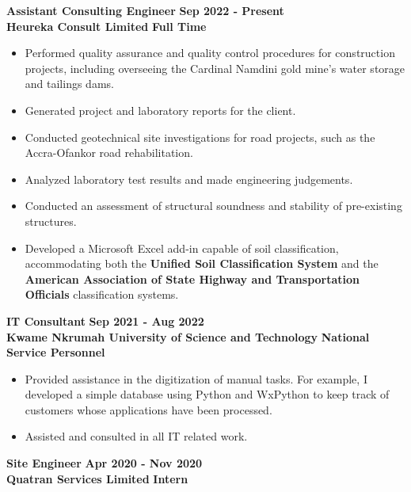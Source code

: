 \documentclass[letterpaper, 12pt]{article}
\newcommand{\verticalSpace}{4pt}
\begin{document}
	\textbf{Assistant Consulting Engineer} \hfill \textbf{Sep 2022 - Present} \\ [\verticalSpace]
	\textbf{Heureka Consult Limited} \hfill \textbf{Full Time}
	
	\begin{itemize}[leftmargin=*]
		
		\item Performed quality assurance and quality control procedures for construction projects, including overseeing the Cardinal Namdini gold mine's water storage and tailings dams.
		\item Generated project and laboratory reports for the client.
		\item Conducted geotechnical site investigations for road projects, such as the Accra-Ofankor road rehabilitation.		
		\item Analyzed laboratory test results and made engineering judgements.
		\item Conducted an assessment of structural soundness and stability of pre-existing structures.
		\item Developed a Microsoft Excel add-in capable of soil classification, accommodating both the \textbf{Unified Soil Classification System} and the \textbf{American Association of State Highway and Transportation Officials} classification systems.	
		
	\end{itemize}
	
	\textbf{IT Consultant} \hfill \textbf{Sep 2021 - Aug 2022} \\ [\verticalSpace]
	\textbf{Kwame Nkrumah University of Science and Technology} \hfill \textbf{National Service Personnel}
	
	\begin{itemize}[leftmargin=*]
		
		\item Provided assistance in the digitization of manual tasks. For example, I developed a simple database using Python and WxPython to keep track of customers whose applications have been processed.
		\item Assisted and consulted in all IT related work. \\
		
	\end{itemize} 
	
	\textbf{Site Engineer} \hfill \textbf{Apr 2020 - Nov 2020} \\ [\verticalSpace]
	\textbf{Quatran Services Limited} \hfill \textbf{Intern}
	
\end{document}
